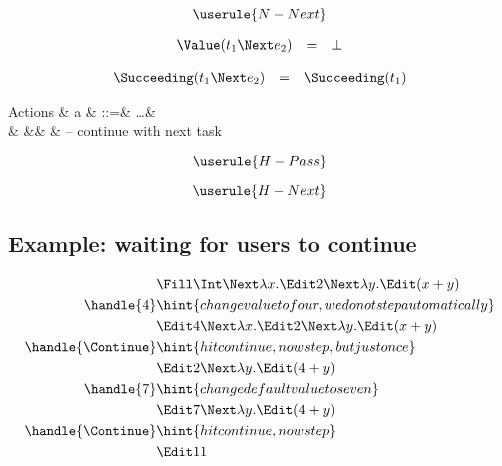 \begin{equation*}
  \userule{N-Next}
\end{equation*}

\begin{equation*}
  \begin{array}{lcl}
    \Value(t_1 \Next e_2) &=& \bot
  \end{array}
\end{equation*}

\begin{equation*}
  \begin{array}{lcl}
    \Succeeding(t_1 \Next e_2) &=& \Succeeding(t_1)
  \end{array}
\end{equation*}

\begin{grammar}
  Actions
    & a & ::=& \ldots & \\
    &   &\mid& \Continue  & – continue with next task \\
\end{grammar}

\begin{equation*}
  \userule{H-Pass}
\end{equation*}

\begin{equation*}
  \userule{H-Next}
\end{equation*}


\subsection{Example: waiting for users to continue}

\begin{align*}
    & \Fill \Int \Next \lambda x. \Edit 2 \Next \lambda y. \Edit (x + y) \\
  \handle{4} & \hint{change value to four, we do not step automatically} \\
    & \Edit 4 \Next \lambda x. \Edit 2 \Next \lambda y. \Edit (x + y) \\
  \handle{\Continue} & \hint{hit continue, now step, but just once} \\
    & \Edit 2 \Next \lambda y. \Edit (4 + y) \\
  \handle{7} & \hint{change default value to seven} \\
    & \Edit 7 \Next \lambda y. \Edit (4 + y) \\
  \handle{\Continue} & \hint{hit continue, now step} \\
    & \Edit 11 \\
\end{align*}

